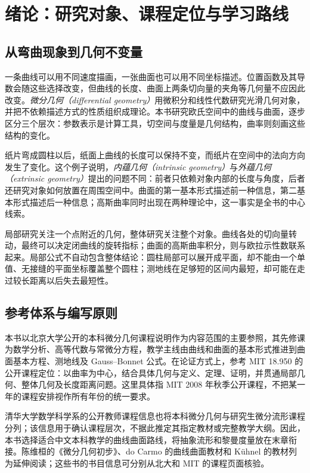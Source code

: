 \chapter{绪论：研究对象、课程定位与学习路线}
\label{chap:dg-intro}

\section{从弯曲现象到几何不变量}
一条曲线可以用不同速度描画，一张曲面也可以用不同坐标描述。位置函数及其导数会随这些选择改变，但曲线的长度、曲面上两条切向量的夹角等几何量不应因此改变。\emph{微分几何（differential geometry）}用微积分和线性代数研究光滑几何对象，并把不依赖描述方式的性质组织成理论。本书研究欧氏空间中的曲线与曲面，逐步区分三个层次：参数表示是计算工具，切空间与度量是几何结构，曲率则刻画这些结构的变化。

纸片弯成圆柱以后，纸面上曲线的长度可以保持不变，而纸片在空间中的法向方向发生了变化。这个例子说明，\emph{内蕴几何（intrinsic geometry）}与\emph{外蕴几何（extrinsic geometry）}提出的问题不同：前者只依赖对象内部的长度与角度，后者还研究对象如何放置在周围空间中。曲面的第一基本形式描述前一种信息，第二基本形式描述后一种信息；高斯曲率同时出现在两种理论中，这一事实是全书的中心线索。

局部研究关注一个点附近的几何，整体研究关注整个对象。曲线各处的切向量转动，最终可以决定闭曲线的旋转指标；曲面的高斯曲率积分，则与欧拉示性数联系起来。局部公式不自动包含整体结论：圆柱局部可以展开成平面，却不能由一个单值、无接缝的平面坐标覆盖整个圆柱；测地线在足够短的区间内最短，却可能在走过较长距离以后失去最短性。

\section{参考体系与编写原则}
本书以北京大学公开的本科微分几何课程说明作为内容范围的主要参照，其先修课为数学分析、高等代数与常微分方程，教学主线由曲线和曲面的基本形式推进到曲面基本方程、测地线及 Gauss--Bonnet 公式\cite{pku-course}。在论证方式上，参考 MIT 18.950 的公开课程定位：以曲率为中心，结合具体几何与定义、定理、证明，并贯通局部几何、整体几何及长度距离问题\cite{mit-syllabus,mit-notes}。这里具体指 MIT 2008 年秋季公开课程，不把某一年的课程安排视作所有年份的统一要求。

清华大学数学科学系的公开教师课程信息也将本科微分几何与研究生微分流形课程分列\cite{tsinghua-course}；该信息用于确认课程层次，不据此推定其指定教材或完整教学大纲。因此，本书选择适合中文本科教学的曲线曲面路线，将抽象流形和黎曼度量放在末章衔接。陈维桓的《微分几何初步》、do Carmo 的曲线曲面教材和 K\"uhnel 的教材列为延伸阅读；这些书的书目信息可分别从北大和 MIT 的课程页面核验\cite{chen,docarmo,kuhnel}。

